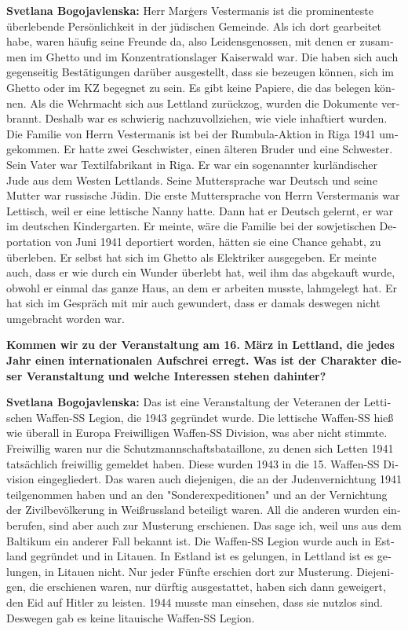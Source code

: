 \begin{otherlanguage}{ngerman}
\textbf{Svetlana Bogojavlenska:} Herr Marģers Vestermanis ist die prominenteste überlebende Persönlichkeit in der jüdischen Gemeinde. Als ich dort gearbeitet habe, waren häufig seine Freunde da, also Leidensgenossen, mit denen er zusammen im Ghetto und im Konzentrationslager Kaiserwald war. Die haben sich auch gegenseitig Bestätigungen darüber ausgestellt, dass sie bezeugen können, sich im Ghetto oder im KZ begegnet zu sein. Es gibt keine Papiere, die das belegen können. Als die Wehrmacht sich aus Lettland zurückzog, wurden die Dokumente verbrannt. Deshalb war es schwierig nachzuvollziehen, wie viele inhaftiert wurden. Die Familie von Herrn Vestermanis ist bei der Rumbula-Aktion in Riga 1941 umgekommen. Er hatte zwei Geschwister, einen älteren Bruder und eine Schwester. Sein Vater war Textilfabrikant in Riga. Er war ein sogenannter kurländischer Jude aus dem Westen Lettlands. Seine Muttersprache war Deutsch und seine Mutter war russische Jüdin. Die erste Muttersprache von Herrn Verstermanis war Lettisch, weil er eine lettische Nanny hatte. Dann hat er Deutsch gelernt, er war im deutschen Kindergarten. Er meinte, wäre die Familie bei der sowjetischen Deportation von Juni 1941 deportiert worden, hätten sie eine Chance gehabt, zu überleben. Er selbst hat sich im Ghetto als Elektriker ausgegeben. Er meinte auch, dass er wie durch ein Wunder überlebt hat, weil ihm das abgekauft wurde, obwohl er einmal das ganze Haus, an dem er arbeiten musste, lahmgelegt hat. Er hat sich im Gespräch mit mir auch gewundert, dass er damals deswegen nicht umgebracht worden war.

\textbf{Kommen wir zu der Veranstaltung am 16. März in Lettland, die jedes Jahr einen internationalen Aufschrei erregt. Was ist der Charakter dieser Veranstaltung und welche Interessen stehen dahinter?}

\textbf{Svetlana Bogojavlenska:} Das ist eine Veranstaltung der Veteranen der Lettischen Waffen-SS Legion, die 1943 gegründet wurde. Die lettische Waffen-SS hieß wie überall in Europa Freiwilligen Waffen-SS Division, was aber nicht stimmte. Freiwillig waren nur die Schutzmannschaftsbataillone, zu denen sich Letten 1941 tatsächlich freiwillig gemeldet haben. Diese wurden 1943 in die 15. Waffen-SS Division eingegliedert. Das waren auch diejenigen, die an der Judenvernichtung 1941 teilgenommen haben und an den "Sonderexpeditionen" und an der Vernichtung der Zivilbevölkerung in Weißrussland beteiligt waren. All die anderen wurden einberufen, sind aber auch zur Musterung erschienen. Das sage ich, weil uns aus dem Baltikum ein anderer Fall bekannt ist. Die Waffen-SS Legion wurde auch in Estland gegründet und in Litauen. In Estland ist es gelungen, in Lettland ist es gelungen, in Litauen nicht. Nur jeder Fünfte erschien dort zur Musterung. Diejenigen, die erschienen waren, nur dürftig ausgestattet, haben sich dann geweigert, den Eid auf Hitler zu leisten. 1944 musste man einsehen, dass sie nutzlos sind. Deswegen gab es keine litauische Waffen-SS Legion. 


\end{otherlanguage}
